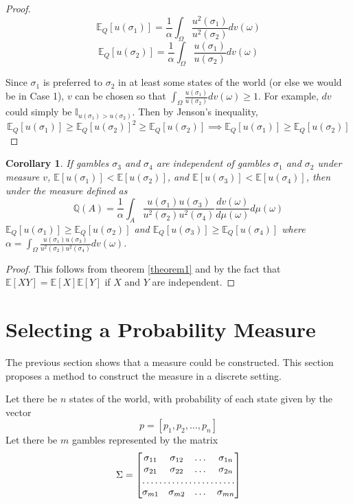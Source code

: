 \documentclass{article}
\newtheorem{corollary}{Corollary}
\begin{document}
\begin{proof}
\[\mathbb{E}_Q[u(\sigma_1)]=\frac{1}{\alpha} \int_\Omega \frac{u^2(\sigma_1)}{u^2(\sigma_2)} dv(\omega)\]
\[\mathbb{E}_Q[u(\sigma_2)]=\frac{1}{\alpha} \int_\Omega \frac{u(\sigma_1)}{u(\sigma_2)} dv(\omega)\]

Since \(\sigma_1\) is preferred to \(\sigma_2\) in at least some states of the world (or else we would be in Case 1), \(v\) can be chosen so that \(\int_\Omega \frac{u(\sigma_1)}{u(\sigma_2)} dv(\omega)\geq 1\).  For example, \(dv\) could simply be \(\mathbb{I}_{u(\sigma_1)>u(\sigma_2)}\).  Then by Jenson's inequality, 
\[\mathbb{E}_Q[u(\sigma_1)] \geq   \mathbb{E}_Q[u(\sigma_2)]^2 \geq  \mathbb{E}_Q[u(\sigma_2)] \implies \mathbb{E}_Q[u(\sigma_1)] \geq \mathbb{E}_Q[u(\sigma_2)] \]

\end{proof}

\begin{corollary}\label{corr1}
	If gambles \(\sigma_3\) and \(\sigma_4\) are independent of gambles \(\sigma_1\) and \(\sigma_2\) under measure \(v\), \(\mathbb{E}[u(\sigma_1)] < \mathbb{E}[u(\sigma_2)]\), and \(\mathbb{E}[u(\sigma_3)] < \mathbb{E}[u(\sigma_4)]\), then under the measure defined as 
	\[\mathbb{Q}(A)=\frac{1}{\alpha}\int_A \frac{u(\sigma_1)u(\sigma_3)}{u^2(\sigma_2)u^2(\sigma_4)} \frac{dv(\omega) }{ d\mu(\omega)} d\mu(\omega)\]
	\(\mathbb{E}_Q[u(\sigma_1)]\geq\mathbb{E}_Q[u(\sigma_2)]\) and \(\mathbb{E}_Q[u(\sigma_3)]\geq\mathbb{E}_Q[u(\sigma_4)]\) where \(\alpha=\int_\Omega \frac{u(\sigma_1)u(\sigma_3)}{u^2(\sigma_2)u^2(\sigma_4)} dv(\omega) \).
\end{corollary}

\begin{proof}
This follows from theorem \ref{theorem1} and by the fact that \(\mathbb{E}[XY]=\mathbb{E}[X]\mathbb{E}[Y]\) if \(X\) and \(Y\) are independent.  
\end{proof}

\section{Selecting a Probability Measure}

The previous section shows that a measure could be constructed.  This section proposes a method to construct the measure in a discrete setting.

Let there be \(n\) states of the world, with probability of each state given by the vector 
\[p = [p_1, p_2, \dotsc, p_n]\]  
Let there be \(m\) gambles represented by the matrix 
\[\Sigma = \begin{bmatrix}
    \sigma_{11}       & \sigma_{12} & \dots & \sigma_{1n} \\
    \sigma_{21}       & \sigma_{22}  & \dots & \sigma_{2n} \\
    \hdotsfor{4} \\
    \sigma_{m1}       & \sigma_{m2} & \dots & \sigma_{mn}
\end{bmatrix}\]
\end{document}
